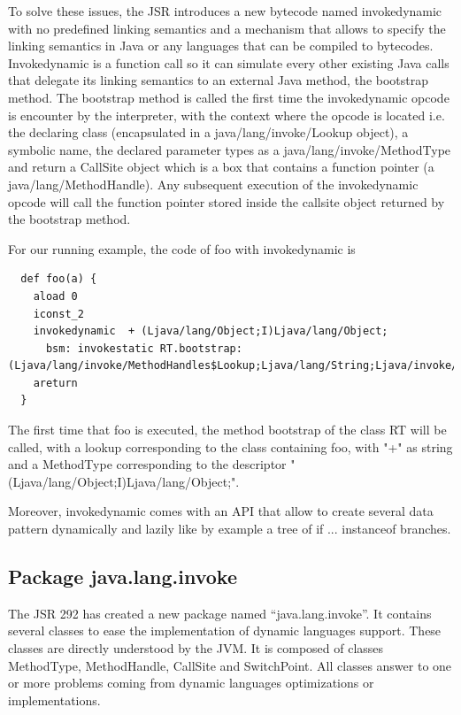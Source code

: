 \documentclass{sigplanconf}
\def \Jsr{\ac{JSR}\xspace}
\def \JSR{\Jsr 292\xspace}
\def \JVM{\ac{JVM}\xspace}
\begin{document}
      To solve these issues, the \Jsr introduces a new bytecode named invokedynamic with no predefined
      linking semantics and a mechanism that allows to specify the linking semantics in Java
      or any languages that can be compiled to bytecodes.
      Invokedynamic is a function call so it can simulate every other existing Java calls that delegate
      its linking semantics to an external Java method, the bootstrap method.
      The bootstrap method is called the first time the invokedynamic opcode is encounter by the interpreter,
      with the context where the opcode is located i.e.
      the declaring class (encapsulated in a java/lang/invoke/Lookup object), a symbolic name,
      the declared parameter types as a java/lang/invoke/MethodType and return
      a CallSite object which is a box that contains a function pointer (a java/lang/MethodHandle).
      Any subsequent execution of the invokedynamic opcode will call the function pointer
      stored inside the callsite object returned by the bootstrap method.
      
      For our running example, the code of foo with invokedynamic is
     {\tiny      
      \begin{verbatim}
  def foo(a) {
    aload 0
    iconst_2 
    invokedynamic  + (Ljava/lang/Object;I)Ljava/lang/Object;
      bsm: invokestatic RT.bootstrap:(Ljava/lang/invoke/MethodHandles$Lookup;Ljava/lang/String;Ljava/invoke/MethodType;)Ljava/lang/invoke/CallSite;
    areturn 
  }
      \end{verbatim}
      }

      The first time that foo is executed, the method bootstrap of the class RT will be called, with a lookup corresponding to the class containing foo,
      with "+" as string and a MethodType corresponding to the descriptor "(Ljava/lang/Object;I)Ljava/lang/Object;".

      

      Moreover, invokedynamic comes with an API that allow to create several data pattern
      dynamically and lazily like by example a tree of if ... instanceof branches.

 
      


    \subsection{Package java.lang.invoke}
      The \JSR has created a new package named ``java.lang.invoke''.
      It contains several classes to ease the implementation of dynamic languages support.
      These classes are directly understood by the \JVM.
      It is composed of classes MethodType, MethodHandle, CallSite and SwitchPoint.
      All classes answer to one or more problems coming from dynamic languages optimizations or implementations.
\end{document}
